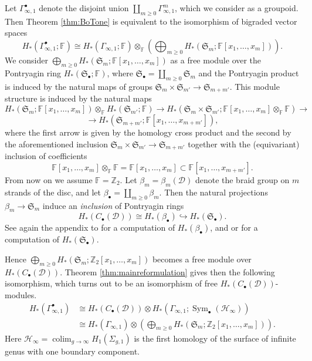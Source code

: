 \documentclass{amsart}
\theoremstyle{plain}
\theoremstyle{definition}
\newcommand{\D}{\mathcal{D}}
\newcommand{\F}{\mathbb{F}}
\renewcommand{\H}{\mathcal{H}}
\newcommand{\fS}{\mathfrak{S}}
\newcommand{\Z}{\mathbb{Z}}
\newcommand{\pa}[1]{\left(#1\right)}
\DeclareMathOperator{\Sym}{Sym}
\def\colim{\mathop{\mathrm{colim}}\nolimits}
\begin{document}
Let $\Gamma_{\infty,1}^{\bullet}$ denote the disjoint union $\coprod_{m\geq 0}\Gamma_{\infty,1}^m$, which we
consider as a groupoid. Then Theorem \ref{thm:BoTone} is equivalent to the isomorphism of bigraded vector spaces
\[
  H_*\pa{\Gamma_{\infty,1}^{\bullet};\F}\cong H_*\pa{\Gamma_{\infty,1};\F}\otimes_{\F} \pa{\bigoplus_{m\geq 0} H_*\pa{\mathfrak{S}_m;\F[x_1,\dots,x_m]}}.
\]
We consider $\bigoplus_{m\geq 0} H_*\pa{\mathfrak{S}_m;\F[x_1,\dots,x_m]}$ as a free module over the Pontryagin ring
$H_*(\fS_{\bullet};\F)$, where $\fS_{\bullet}=\coprod_{m\geq 0}\fS_m$ and the Pontryagin product is induced by
the natural maps of groups $\fS_m\times\fS_{m'}\to\fS_{m+m'}$. This module structure is induced by the natural maps
\[
H_*\pa{\fS_m;\F[x_1,\dots,x_m]}\otimes_{\F} H_*\pa{\fS_{m'};\F}\to  H_*\pa{\fS_m\times\fS_{m'};\F[x_1,\dots,x_m]\otimes_{\F}\F} \to
\]
\[
\to H_*\pa{\fS_{m+m'};\F[x_1,\dots,x_{m+m'}]},
\]
where the first arrow is given by the homology cross product and the second by the aforementioned inclusion
$\fS_m\times\fS_{m'}\to\fS_{m+m'}$ together with the (equivariant) inclusion
of coefficients
\[
\F[x_1,\dots,x_m]\otimes_{\F}\F=\F[x_1,\dots,x_m]\subset \F[x_1,\dots,x_{m+m'}].
\]
From now on we assume $\F=\Z_2$.
Let $\beta_m=\beta_m(\D)$ denote the braid group on $m$ strands of the disc, and let $\beta_{\bullet}=\coprod_{m\geq 0}\beta_m$.
Then the natural projections $\beta_m\to\fS_m$ induce an \emph{inclusion} of Pontryagin rings
\[
 H_*(C_{\bullet}(\D))\cong H_*(\beta_{\bullet})\hookrightarrow H_*(\fS_{\bullet}).
\]
See again the appendix to \cite[Chap.III]{CLM} for a computation of $H_*(\beta_{\bullet})$,
and \cite{Nakaoka:infinite} or \cite{GiustiSalvatoreSinha} for a computation of $H_*(\fS_{\bullet})$.

Hence $\bigoplus_{m\geq 0} H_*\pa{\mathfrak{S}_m;\Z_2[x_1,\dots,x_m]}$ becomes a free module over $H_*(C_{\bullet}(\D))$.
Theorem \ref{thm:mainreformulation} gives then the following isomorphism, which turns out to be an isomorphism of free
$H_*(C_{\bullet}(\D))$-modules.
\begin{equation}
 \label{eq:doubleiso}
\begin{split}
  H_*\pa{\Gamma_{\infty,1}^{\bullet}} & \cong H_*(C_{\bullet}(\D))\otimes H_*\pa{\Gamma_{\infty,1};\Sym_{\bullet}(\H_{\infty})}\\
  & \cong H_*\pa{\Gamma_{\infty,1}}\otimes \pa{\bigoplus_{m\geq 0} H_*\pa{\mathfrak{S}_m;\Z_2[x_1,\dots,x_m]}}.
  \end{split}
\end{equation}
Here $\H_{\infty}=\colim_{g\to\infty} H_1(\Sigma_{g,1})$ is the first homology of the surface of infinite genus with one
boundary component.
\end{document}
